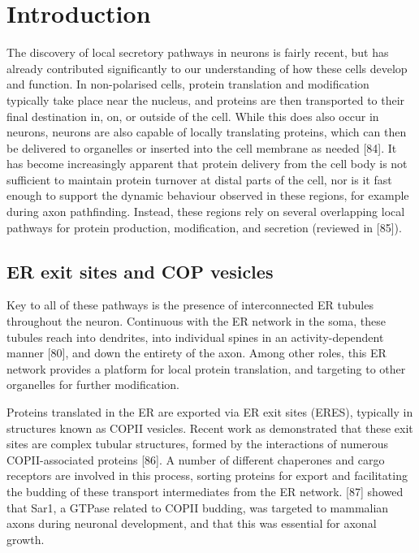 \documentclass[
  12pt,
  a4paper,
]{book}
\begin{document}

\hypertarget{introduction-2}{%
\section{Introduction}\label{introduction-2}}

The discovery of local secretory pathways in neurons is fairly recent, but has already contributed significantly to our understanding of how these cells develop and function. In non-polarised cells, protein translation and modification typically take place near the nucleus, and proteins are then transported to their final destination in, on, or outside of the cell. While this does also occur in neurons, neurons are also capable of locally translating proteins, which can then be delivered to organelles or inserted into the cell membrane as needed {[}84{]}. It has become increasingly apparent that protein delivery from the cell body is not sufficient to maintain protein turnover at distal parts of the cell, nor is it fast enough to support the dynamic behaviour observed in these regions, for example during axon pathfinding. Instead, these regions rely on several overlapping local pathways for protein production, modification, and secretion (reviewed in {[}85{]}).

\hypertarget{er-exit-sites-and-cop-vesicles}{%
\subsection{ER exit sites and COP vesicles}\label{er-exit-sites-and-cop-vesicles}}

Key to all of these pathways is the presence of interconnected ER tubules throughout the neuron. Continuous with the ER network in the soma, these tubules reach into dendrites, into individual spines in an activity-dependent manner {[}80{]}, and down the entirety of the axon. Among other roles, this ER network provides a platform for local protein translation, and targeting to other organelles for further modification.

Proteins translated in the ER are exported via ER exit sites (ERES), typically in structures known as COPII vesicles. Recent work as demonstrated that these exit sites are complex tubular structures, formed by the interactions of numerous COPII-associated proteins {[}86{]}. A number of different chaperones and cargo receptors are involved in this process, sorting proteins for export and facilitating the budding of these transport intermediates from the ER network. {[}87{]} showed that Sar1, a GTPase related to COPII budding, was targeted to mammalian axons during neuronal development, and that this was essential for axonal growth.
\end{document}
